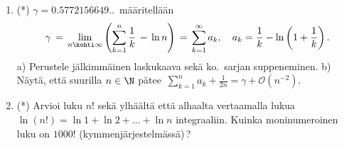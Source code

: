\begin{enumerate}
\item (*) 
 $\gamma=0.5772156649..\,$ määritellään
\[
\gamma\,=\,\lim_{n\kohti\infty} \left(\sum_{k=1}^n \frac{1}{k}\,-\,\ln n\right)\,
        =\,\sum_{k=1}^\infty a_k, \quad a_k=\frac{1}{k}-\ln\left(1+\frac{1}{k}\right).
\]
a) Perustele jälkimmäinen laskukaava sekä ko.\ sarjan suppeneminen. \newline
b) Näytä, että suurilla $n\in\N$ pätee
   $\,\sum_{k=1}^na_k + \frac{1}{2n} = \gamma + \mathcal{O}(n^{-2})$.
        
\item (*)
Arvioi luku $n!$ sekä ylhäältä että alhaalta vertaamalla lukua 
$\ln(n!) = \ln 1 + \ln 2 + \dots + \ln n$ integraaliin. Kuinka moninumeroinen luku on $1000!$
(kymmenjärjestelmässä)\,?

\end{enumerate}